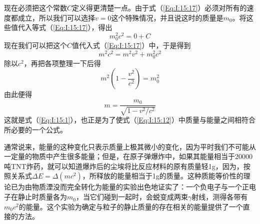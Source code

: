 现在必须把这个常数$C$定义得更清楚一点。由于式（\ref{Eq:I:15:17}）必须对所有的速度都成立，所以我们可以选择$v=0$这个特殊情况，并且说这时的质量是$m_0$。将这些值代入等式（\ref{Eq:I:15:17}），得出
\begin{equation*}
    m_0^2c^2=0+C
\end{equation*}
现在我们可以把这个$C$值代入式（\ref{Eq:I:15:17}）中，于是得到
\begin{equation}
    \label{Eq:I:15:18}
    m^2c^2=m^2v^2+m_0^2c^2
\end{equation}
除以$c^2$，再把各项整理一下后得
\begin{equation*}
    m^2(1-\frac{v^2}{c^2})=m_0^2
\end{equation*}
由此便得
\begin{equation*}
    m=\frac{m_0}{\sqrt{1-v^2/c^2}}
\end{equation*}
这就是式（\ref{Eq:I:15:1}），也正是为了使式（\ref{Eq:I:15:12}）中质量与能量之间相符合所必要的一个公式。

通常说来，能量的这种变化只表示质量上极其微小的变化，因为平时我们不可能从一定量的物质中产生很多能量；但是，在原子弹爆炸中，如果其能量相当于20000吨TNT炸药，就可以知道爆炸后的尘埃将比反应材料的原有质量轻1g，因为，按照关系式$\Delta E=\Delta (mc^2)$，所释放的能量相当于1g的质量。这种质能等价性的理论已为由物质湮没而完全转化为能量的实验出色地证实了：一个负电子与一个正电子在静止时质量各为$m_0$，当它们碰到一起时，会蜕变成两束$\gamma$射线，测得各带有$m_0c^2$的能量。这个实验为确定与粒子的静止质量的存在相关的能量提供了一个直接的方法。
